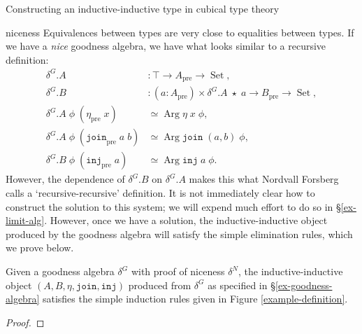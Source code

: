 \documentclass[acmsmall,review]{acmart}\settopmatter{printfolios=true,printccs=false,printacmref=false}
\DeclareMathOperator{\USet}{Set}
\DeclareMathOperator{\Arg}{Arg}
\newcommand{\pre}[1]{{#1}_\text{pre}}
\newcommand{\join}{\texttt{join}}
\newcommand{\inj}{\texttt{inj}}
\def\Forsberg/{Nordvall Forsberg}
\begin{document}
\begin{section}{Constructing an inductive-inductive type in cubical type theory}
\begin{subsection}{niceness}
Equivalences between types are very close to equalities between types. If we have a \emph{nice} goodness algebra, we have what looks similar to a recursive definition:
\begin{align*}
\delta^G.A &: \top \to \pre{A} \to \USet,\\
\delta^G.B &: (a : \pre{A}) \times \delta^G.A\;\star\;a \to \pre{B} \to \USet,\\
\delta^G.A\;\phi\;(\pre{\eta}\;x) &\simeq \Arg\eta\;x\;\phi,\\
\delta^G.A\;\phi\;(\pre{\join}\;a\;b) &\simeq \Arg\join\;(a, b)\;\phi,\\
\delta^G.B\;\phi\;(\pre{\inj}\;a) &\simeq \Arg\inj\;a\;\phi.
\end{align*}
However, the dependence of $\delta^G.B$ on $\delta^G.A$ makes this what \Forsberg/ calls a `recursive-recursive' definition. It is not immediately clear how to construct the solution to this system; we will expend much effort to do so in \S\ref{ex-limit-alg}. However, once we have a solution, the inductive-inductive object produced by the goodness algebra will satisfy the simple elimination rules, which we prove below.

\begin{lemma}
    Given a goodness algebra $\delta^G$ with proof of niceness $\delta^N$, the inductive-inductive object $(A, B, \eta, \join, \inj)$ produced from $\delta^G$ as specified in \S\ref{ex-goodness-algebra} satisfies the simple induction rules given in Figure \ref{example-definition}.
\end{lemma}
\begin{proof}


\end{proof}
\end{subsection}
\end{section}
\end{document}
